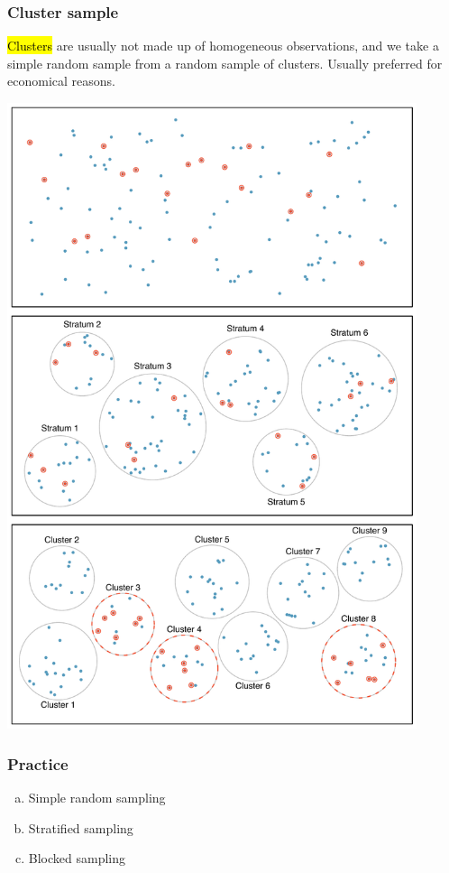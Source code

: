 \begin{frame}
\frametitle{Cluster sample}

\hl{Clusters} are usually not made up of homogeneous observations, and we take a simple random sample from a random sample of clusters. Usually preferred for economical reasons.

\begin{center}
\includegraphics[width=0.9\textwidth]{1-4_obs_studies_sampling/figures/sampling_methods/cluster}
\end{center}

\end{frame}


\begin{frame}
\frametitle{Practice}


\begin{enumerate}[(a)]
\item Simple random sampling
\item Stratified sampling
\item Blocked sampling
\end{enumerate}

\end{frame}

